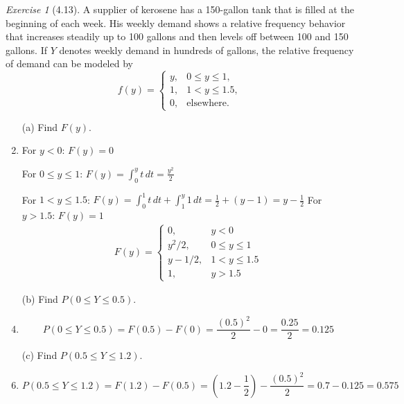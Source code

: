\documentclass[12pt]{amsart}
\makeatletter
\theoremstyle{remark}
\newtheorem*{exercise}{Exercise}%
\renewenvironment{proof}[1][\proofname]{\par\doublespacing
  \pushQED{\qed}%
  \normalfont \topsep6\p@\@plus6\p@\relax
  \list{}{%
    \settowidth{\leftmargin}{\itshape\proofname:\hskip\labelsep}%
    \setlength{\labelwidth}{0pt}%
    \setlength{\itemindent}{-\leftmargin}%
  }%
  \item[\hskip\labelsep\itshape#1\@addpunct{:}]\ignorespaces
}{%
  \popQED\endlist\@endpefalse
  \singlespacing
}
\theoremstyle{mycomment}
\makeatother
\begin{document}
\begin{exercise}[4.13]
A supplier of kerosene has a 150-gallon tank that is filled at the beginning of each week. His weekly demand shows a relative frequency behavior that increases steadily up to 100 gallons and then levels off between 100 and 150 gallons. If $Y$ denotes weekly demand in hundreds of gallons, the relative frequency of demand can be modeled by
$$f(y) = \begin{cases}
y, & 0 \leq y \leq 1, \\
1, & 1 < y \leq 1.5, \\
0, & \text{elsewhere}.
\end{cases}$$

\begin{enumerate}
    \item[(a)] Find $F(y)$.
\begin{proof}[Solution]
 For $y < 0$: $F(y) = 0$
	
	For $0 \leq y \leq 1$: $F(y) = \int_0^y t \, dt = \frac{y^2}{2}$
	
	For $1 < y \leq 1.5$: $F(y) = \int_0^1 t \, dt + \int_1^y 1 \, dt = \frac{1}{2} + (y - 1) = y - \frac{1}{2}$
  For $y > 1.5$: $F(y) = 1$
  \begin{align*}
	F(y) = \begin{cases}
	0, & y < 0 \\
	y^2/2, & 0 \leq y \leq 1 \\
	y - 1/2, & 1 < y \leq 1.5 \\
	1, & y > 1.5
	\end{cases}
\end{align*}
\end{proof}
    \item[(b)] Find $P(0 \leq Y \leq 0.5)$.
\begin{proof}[Solution]
 	$$P(0 \leq Y \leq 0.5) = F(0.5) - F(0) = \frac{(0.5)^2}{2} - 0 = \frac{0.25}{2} = 0.125$$
\end{proof}
    \item[(c)] Find $P(0.5 \leq Y \leq 1.2)$.
\begin{proof}[Solution]
 	$$P(0.5 \leq Y \leq 1.2) = F(1.2) - F(0.5) = \left(1.2 - \frac{1}{2}\right) - \frac{(0.5)^2}{2} = 0.7 - 0.125 = 0.575$$
\end{proof}
\end{enumerate} 
\end{exercise}
\end{document}
